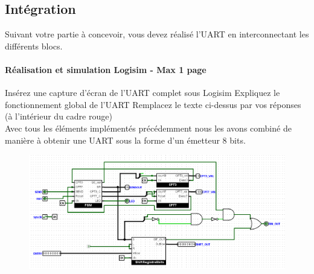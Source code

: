 \documentclass[a4paper]{article} %
\begin{document}
\subsection{Intégration}
Suivant votre partie à concevoir, vous devez réalisé l’UART en interconnectant les différents blocs. 
\begin{tcolorbox}[colframe=Monokaimagenta,colback=white, breakable, enhanced]
\paragraph{Réalisation et simulation Logisim - Max 1 page}
Insérez une capture d’écran de l’UART complet sous Logisim
Expliquez le fonctionnement global de l’UART
Remplacez le texte ci-dessus par vos réponses (à l’intérieur du cadre rouge)
\\

Avec tous les éléments implémentés précédemment nous les avons combiné de manière à obtenir une UART sous la forme d'un émetteur 8 bits.
\begin{figure}[H]
	\centering
	\includegraphics[width=\textwidth]{src/UART}
	\label{fig:UART4}
\end{figure}


\end{tcolorbox}
\end{document}
